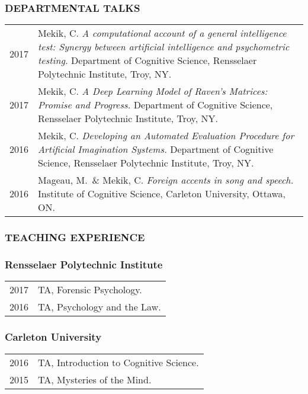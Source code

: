 \documentclass[12pt, letterpaper]{article}
\begin{document}
\subsubsection*{DEPARTMENTAL TALKS}
\begin{longtable}{p{}p{}}
2017&\noindent\hangindent=1cm Mekik, C. \emph{A computational account of a general intelligence test: Synergy between artificial intelligence and psychometric testing.} Department of Cognitive Science, Rensselaer Polytechnic Institute, Troy, NY.\\

2017&\noindent\hangindent=1cm Mekik, C. \emph{A Deep Learning Model of Raven's Matrices: Promise and Progress.} Department of Cognitive Science, Rensselaer Polytechnic Institute, Troy, NY.\\

2016&\noindent\hangindent=1cm Mekik, C. \emph{Developing an Automated Evaluation Procedure for Artificial Imagination Systems.} Department of Cognitive Science, Rensselaer Polytechnic Institute, Troy, NY.\\

2016&\noindent\hangindent=1cm Mageau, M.\ \& Mekik, C. \emph{Foreign accents in song and speech.} Institute of Cognitive Science, Carleton University, Ottawa, ON.
\end{longtable}

\subsubsection*{TEACHING EXPERIENCE}

\subsubsection*{Rensselaer Polytechnic Institute}

\begin{longtable}{p{}p{}}
2017 & TA, Forensic Psychology.\\
2016 & TA, Psychology and the Law.
\end{longtable}

\subsubsection*{Carleton University}
\begin{longtable}{p{}p{}}
2016 & TA, Introduction to Cognitive Science.\\
2015 & TA, Mysteries of the Mind.
\end{longtable}
\end{document}
